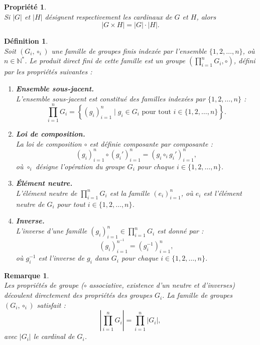 \documentclass[a4paper, 14pt]{report}
\newtheorem{definition}{Définition}[section]
\newtheorem{remark}{Remarque}[section]
\newtheorem{propriety}{Propriété}[section]
\begin{document}
\begin{onehalfspace}
{\begin{propriety} \cite{schaub1997} \\
Si \( |G| \) et \( |H| \) désignent respectivement les cardinaux de \( G \) et \( H \), alors \[
	|G \times H| = |G| \cdot |H|.
	\]
\end{propriety}


\begin{definition} \cite{schaub1997}\\
Soit \( (G_i, \circ_i) \) une famille de groupes finis indexée par l'ensemble \( \{1, 2, \dots, n\} \), où \( n \in \mathbb{N}^{*} \). Le \textit{produit direct fini} de cette famille est un groupe \( \left( \prod_{i=1}^{n} G_i, \circ \right) \), défini par les propriétés suivantes : 
	\begin{enumerate}[label=\roman*)]
		\item \textbf{Ensemble sous-jacent.} \\
L'ensemble sous-jacent est constitué des familles indexées par \( \{1, 2, \dots, n\} \) :  
		\[
		\prod_{i=1}^{n} G_i = \left\{ (g_i)_{i=1}^{n} \mid g_i \in G_i \text{ pour tout } i \in \{1, 2, \dots, n\} \right\}.
		\]
		\item \textbf{Loi de composition.} \\
		La loi de composition \( \circ \) est définie composante par composante :  
		\[
		(g_i)_{i=1}^{n} \circ (g_i')_{i=1}^{n} = (g_i \circ_i g_i')_{i=1}^{n},
		\]  
		où \( \circ_i \) désigne l'opération du groupe \( G_i \) pour chaque \( i \in \{1, 2, \dots, n\} \).
		\item \textbf{Élément neutre.} \\
L'élément neutre de \( \prod_{i=1}^{n} G_i \) est la famille \( (e_i)_{i=1}^{n} \), où \( e_i \) est l'élément neutre de \( G_i \) pour tout \( i \in \{1, 2, \dots, n\} \).
		\item \textbf{Inverse.} \\
L'inverse d'une famille \( (g_i)_{i=1}^{n} \in \prod_{i=1}^{n} G_i \) est donné par :  
		\[
		(g_i)_{i=1}^{{n}^{-1}} = (g_i^{-1})_{i=1}^{n},
		\]  
		où \( g_i^{-1} \) est l'inverse de \( g_i \) dans \( G_i \) pour chaque \( i \in \{1, 2, \dots, n\} \).\\
	\end{enumerate}
\end{definition}


\begin{remark} \cite{schaub1997} \\
Les propriétés de groupe (\( \circ \) associative, existence d’un neutre et d’inverses) découlent directement des propriétés des groupes \( G_i \).
La famille de groupes \( (G_i, \circ_i) \) satisfait :
\[
\left| \prod_{i=1}^{n} G_i \right| = \prod_{i=1}^{n} |G_i|,
\]
avec \( |G_i| \) le cardinal de \( G_i \).\\
\end{remark}

}
\end{onehalfspace}
\end{document}
